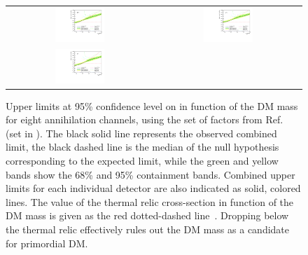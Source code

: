 \begin{figure}[h]
{\begin{tabular}{cc}
        \includegraphics[width=0.35\textwidth]{figures/glory_duck/limits/Glory_Duck_Annihilation_ee_Geringer-Sameth_Combination_bands.pdf} &
        \includegraphics[width=0.35\textwidth]{figures/glory_duck/limits/Glory_Duck_Annihilation_mumu_Geringer-Sameth_Combination_bands.pdf} \\
        \includegraphics[width=0.35\textwidth]{figures/glory_duck/limits/Glory_Duck_Annihilation_tautau_Geringer-Sameth_Combination_bands.pdf} &
        \end{tabular}
        }
        \caption{Upper limits at 95\% confidence level on \sv in function of the DM mass for eight annihilation channels, using the set of \J factors from Ref.~\cite{Geringer-Sameth:2014yza} (\GS set in ). The black solid line represents the observed combined limit, the black dashed line is the median of the null hypothesis corresponding to the expected limit, while the green and yellow bands show the 68\% and 95\% containment bands. Combined upper limits for each individual detector are also indicated as solid, colored lines.
        The value of the thermal relic cross-section in function of the DM mass is given as the red dotted-dashed line~\cite{Bertone_2005}. Dropping below the thermal relic effectively rules out the DM mass as a candidate for primordial DM.}
    \label{fig:limits-geringer-sameth}
    \end{figure}

